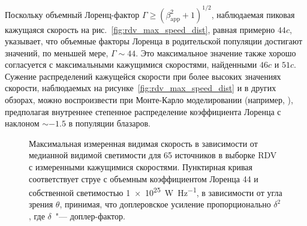 Поскольку объемный Лоренц-фактор $\Gamma\ge (\beta_\mathrm{app}^{2}+1)^{1/2}$, наблюдаемая пиковая
кажущаяся скорость на рис.~\ref{fig:rdv_max_speed_dist}, равная примерно $44c$, указывает, что
объемные факторы Лоренца в родительской популяции достигают значений, по меньшей мере,
$\Gamma\sim44$. Это максимальное значение также хорошо согласуется с максимальными кажущимися
скоростями, найденными \cite{Jorstad_2005} $46c$ и \cite{Lister_2009b} $51c$. Сужение распределений
кажущейся скорости при более высоких значениях скорости, наблюдаемых на
рисунке~\ref{fig:rdv_max_speed_dist} и в других обзорах, можно воспроизвести при Монте-Карло
моделировании (например, \cite{Lister_1997,Lister_2009b}), предполагая внутреннее степенное
распределение коэффициента Лоренца с наклоном $\sim-1.5$ в популяции блазаров.

\begin{figure}[]
 \caption{Максимальная измеренная видимая скорость в зависимости от медианной видимой светимости
для 65 источников в выборке RDV с измеренными кажущимися скоростями. Пунктирная кривая
соответствует струе с объемным коэффициентом Лоренца 44 и собственной светимостью
\SI{1e25}{\watt\per\hertz}, в зависимости от угла зрения $\theta$, принимая, что доплеровское
усиление пропорционально $\delta^2$, где $\delta$~"--- доплер-фактор.}
 \label{fig:rdv_speed_vs_lum}
\end{figure}

